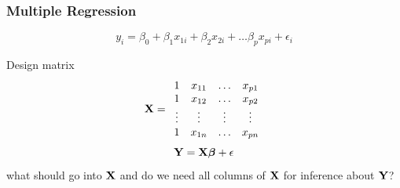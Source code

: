 \documentclass[handout]{beamer}\usepackage[]{graphicx}\usepackage[]{color}
\begin{document}
\begin{frame}
  \frametitle{Multiple Regression}
  $$y_i = \beta_0 + \beta_1 x_{1i} + \beta_2 x_{2i} + \ldots \beta_{p}
  x_{p i} + \epsilon_i$$

\pause
Design matrix  $$\mathbf{X} =
\begin{array}{cccc}
  1 & x_{11} & \ldots & x_{p1} \\
  1 & x_{12}  & \ldots & x_{p2} \\
  \vdots & \vdots  & \vdots & \vdots \\
  1 & x_{1n} & \ldots & x_{pn} \\
\end{array}
$$
\pause
$$\mathbf{Y} = \mathbf{X} \boldsymbol{\beta} + \epsilon$$
\pause
what should go into $\mathbf{X}$ and do we need all columns of $\mathbf{X}$ for
inference about $\mathbf{Y}$?
\end{frame}
\end{document}
